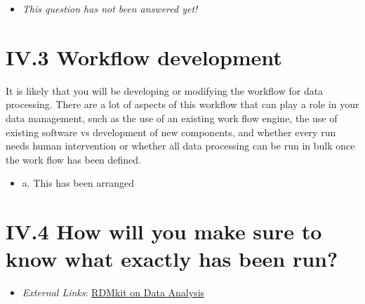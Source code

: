 \documentclass[a4paper,12pt]{report}
\begin{document}
\begin{itemize}
  \item[\XSolidBrush] \textit{This question has not been answered yet!}
\end{itemize}
  


\section*{\protect\textcolor{colorSecId}{IV.3} Workflow development}

\label{10a10ffd-bfe1-4c6b-bbb6-3dfb1e63a5d5.4ba3304e-225c-4916-bbf7-754de381253c}




\noindent
\begin{markdown}
It is likely that you will be developing or modifying the workflow for data processing. There are a lot of aspects of this workflow that can play a role in your data management, such as the use of an existing work flow engine, the use of existing software vs development of new components, and whether every run needs human intervention or whether all data processing can be run in bulk once the work flow has been defined.
\end{markdown}



\begin{itemize}
  \item[\CheckmarkBold] a. This has been arranged
\end{itemize}






\section*{\protect\textcolor{colorSecId}{IV.4} How will you make sure to know what exactly has been run?}

\label{10a10ffd-bfe1-4c6b-bbb6-3dfb1e63a5d5.1991077f-04ae-4808-90a5-e4b2f82e30bf}


\begin{itemize}
  \item \textit{External Links}: \href{https://rdmkit.elixir-europe.org/data_analysis.html}{RDMkit on Data Analysis}\end{itemize}
\end{document}
